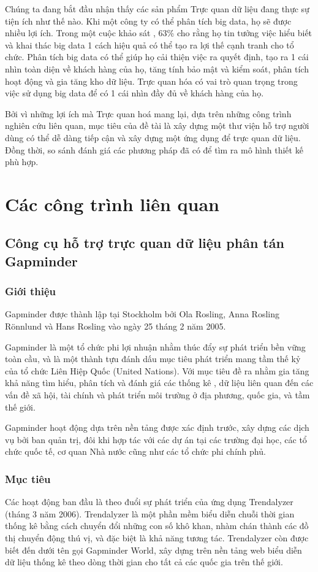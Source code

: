 \documentclass[12pt,a4paper]{article}
\begin{document}
Chúng ta đang bắt đầu nhận thấy các sản phẩm Trực quan dữ liệu đang thực sự tiện ích như thế nào. Khi một công ty có thể phân tích big data, họ sẽ được nhiều lợi ích. Trong một cuộc khảo sát \cite{paper1}, 63\% cho rằng họ tin tưởng việc hiểu biết và khai thác big data 1 cách hiệu quả có thể tạo ra lợi thế cạnh tranh cho tổ chức. Phân tích big data có thể giúp họ cải thiện việc ra quyết định, tạo ra 1 cái nhìn toàn diện về khách hàng của họ, tăng tính bảo mật và kiểm soát, phân tích hoạt động và gia tăng kho dữ liệu. Trực quan hóa có vai trò quan trọng trong việc sử dụng big data để có 1 cái nhìn đầy đủ về khách hàng của họ.

Bởi vì những lợi ích mà Trực quan hoá mang lại, dựa trên những công trình nghiên cứu liên quan, mục tiêu của đề tài là xây dựng một thư viện hỗ trợ người dùng có thể dễ dàng tiếp cận và xây dựng một ứng dụng để trực quan dữ liệu. Đồng thời, so sánh  đánh giá các phương pháp đã có để tìm ra mô hình thiết kế phù hợp.  

\section{Các công trình liên quan}
\subsection{Công cụ hỗ trợ trực quan dữ liệu phân tán Gapminder}
\subsubsection{Giới thiệu}
Gapminder\cite{gapminder} được thành lập tại Stockholm bởi Ola Rosling, Anna Rosling Rönnlund và Hans Rosling vào ngày 25 tháng 2 năm 2005. 

Gapminder là một tổ chức phi lợi nhuận nhằm thúc đẩy sự phát triển bền vững toàn cầu, và là một thành tựu đánh dấu mục tiêu phát triển mang tầm thế kỷ của tổ chức Liên Hiệp Quốc (United Nations). Với mục tiêu đề ra nhằm gia tăng khả năng tìm hiểu, phân tích và đánh giá các thống kê , dữ liệu liên quan đến các vấn đề xã hội, tài chính và phát triển môi trường ở địa phương, quốc gia, và tầm thế giới.

Gapminder hoạt động dựa trên nền tảng được xác định trước, xây dựng các dịch vụ bởi ban quản trị, đôi khi hợp tác với các dự án  tại các trường đại học, các tổ chức quốc tế, cơ quan Nhà nước cũng như các tổ chức phi chính phủ.

\subsubsection{Mục tiêu}
Các hoạt động ban đầu là theo đuổi sự phát triển của ứng dụng Trendalyzer (tháng 3 năm 2006). Trendalyzer là một phần mềm biểu diễn chuỗi thời gian thống kê bằng cách chuyển đổi những con số khô khan, nhàm chán thành các đồ thị chuyển động thú vị, và đặc biệt là khả năng tương tác. Trendalyzer còn được biết đến dưới tên gọi Gapminder World, xây dựng trên nền tảng web biểu diễn dữ liệu thống kê theo dòng thời gian cho tất cả các quốc gia trên thế giới.
\end{document}

